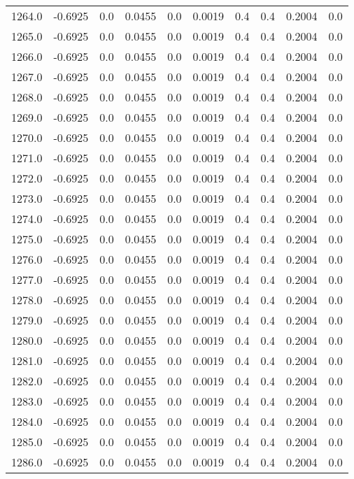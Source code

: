 \begin{longtable}{lrrrrrrrrr}
1264.0 & -0.6925 & 0.0 & 0.0455 & 0.0 & 0.0019 & 0.4 & 0.4 & 0.2004 & 0.0 \\
1265.0 & -0.6925 & 0.0 & 0.0455 & 0.0 & 0.0019 & 0.4 & 0.4 & 0.2004 & 0.0 \\
1266.0 & -0.6925 & 0.0 & 0.0455 & 0.0 & 0.0019 & 0.4 & 0.4 & 0.2004 & 0.0 \\
1267.0 & -0.6925 & 0.0 & 0.0455 & 0.0 & 0.0019 & 0.4 & 0.4 & 0.2004 & 0.0 \\
1268.0 & -0.6925 & 0.0 & 0.0455 & 0.0 & 0.0019 & 0.4 & 0.4 & 0.2004 & 0.0 \\
1269.0 & -0.6925 & 0.0 & 0.0455 & 0.0 & 0.0019 & 0.4 & 0.4 & 0.2004 & 0.0 \\
1270.0 & -0.6925 & 0.0 & 0.0455 & 0.0 & 0.0019 & 0.4 & 0.4 & 0.2004 & 0.0 \\
1271.0 & -0.6925 & 0.0 & 0.0455 & 0.0 & 0.0019 & 0.4 & 0.4 & 0.2004 & 0.0 \\
1272.0 & -0.6925 & 0.0 & 0.0455 & 0.0 & 0.0019 & 0.4 & 0.4 & 0.2004 & 0.0 \\
1273.0 & -0.6925 & 0.0 & 0.0455 & 0.0 & 0.0019 & 0.4 & 0.4 & 0.2004 & 0.0 \\
1274.0 & -0.6925 & 0.0 & 0.0455 & 0.0 & 0.0019 & 0.4 & 0.4 & 0.2004 & 0.0 \\
1275.0 & -0.6925 & 0.0 & 0.0455 & 0.0 & 0.0019 & 0.4 & 0.4 & 0.2004 & 0.0 \\
1276.0 & -0.6925 & 0.0 & 0.0455 & 0.0 & 0.0019 & 0.4 & 0.4 & 0.2004 & 0.0 \\
1277.0 & -0.6925 & 0.0 & 0.0455 & 0.0 & 0.0019 & 0.4 & 0.4 & 0.2004 & 0.0 \\
1278.0 & -0.6925 & 0.0 & 0.0455 & 0.0 & 0.0019 & 0.4 & 0.4 & 0.2004 & 0.0 \\
1279.0 & -0.6925 & 0.0 & 0.0455 & 0.0 & 0.0019 & 0.4 & 0.4 & 0.2004 & 0.0 \\
1280.0 & -0.6925 & 0.0 & 0.0455 & 0.0 & 0.0019 & 0.4 & 0.4 & 0.2004 & 0.0 \\
1281.0 & -0.6925 & 0.0 & 0.0455 & 0.0 & 0.0019 & 0.4 & 0.4 & 0.2004 & 0.0 \\
1282.0 & -0.6925 & 0.0 & 0.0455 & 0.0 & 0.0019 & 0.4 & 0.4 & 0.2004 & 0.0 \\
1283.0 & -0.6925 & 0.0 & 0.0455 & 0.0 & 0.0019 & 0.4 & 0.4 & 0.2004 & 0.0 \\
1284.0 & -0.6925 & 0.0 & 0.0455 & 0.0 & 0.0019 & 0.4 & 0.4 & 0.2004 & 0.0 \\
1285.0 & -0.6925 & 0.0 & 0.0455 & 0.0 & 0.0019 & 0.4 & 0.4 & 0.2004 & 0.0 \\
1286.0 & -0.6925 & 0.0 & 0.0455 & 0.0 & 0.0019 & 0.4 & 0.4 & 0.2004 & 0.0 \\

\end{longtable}
